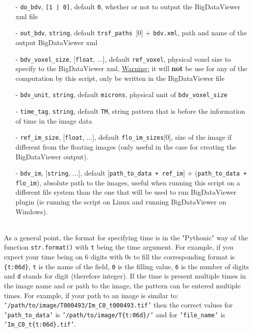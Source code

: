 \documentclass[10pt,a4paper]{book}
\newcommand{\option}[1]{{\texttt{'#1'}}}
\begin{document}
\begin{enumerate}
\item[-] \texttt{do\_bdv}, \texttt{[1 | 0]}, default \texttt{0}, whether or not to output the BigDataViewer xml file
\item[-] \texttt{out\_bdv}, \texttt{string}, default \texttt{trsf\_paths }[0] + \texttt{bdv.xml}, path and name of the output BigDataViewer xml
\item[-] \texttt{bdv\_voxel\_size}, [\texttt{float}, ...], default \texttt{ref\_voxel}, physical voxel size to specify to the BigDataViewer xml, \underline{Warning:} it will \textbf{not} be use for any of the computation by this script, only be written in the BigDataViewer file
\item[-] \texttt{bdv\_unit}, \texttt{string}, default \texttt{microns}, physical unit of \texttt{bdv\_voxel\_size}
\item[-] \texttt{time\_tag}, \texttt{string}, default \texttt{TM}, string pattern that is before the information of time in the image data
\item[-] \texttt{ref\_im\_size}, [\texttt{float}, ...], default \texttt{flo\_im\_sizes}[0], size of the image if different from the floating images (only useful in the case for creating the BigDataViewer output).
\item[-] \texttt{bdv\_im}, [\texttt{string}, ...], default [\texttt{path\_to\_data + ref\_im}] + (\texttt{path\_to\_data + flo\_im}), absolute path to the images, useful when running this script on a different file system than the one that will be used to run BigDataViewer plugin (ie running the script on Linux and running BigDataViewer on Windows).
\end{enumerate}~\\
As a general point, the format for specifying time is in the "Pythonic" way of the function \texttt{str.format()} with \texttt{t} being the time argument. For example, if you expect your time being on 6 digits with 0s to fill the corresponding format is \texttt{\{t:06d\}}, \texttt{t} is the name of the field, \texttt{0} is the filling value, \texttt{6} is the number of digits and \texttt{d} stands for digit (therefore integer). If the time is present multiple times in the image name and or path to the image, the pattern can be entered multiple times. For example, if your path to an image is similar to: \option{/path/to/image/T000493/Im\_C0\_t000493.tif} then the correct values for \option{path\_to\_data} is \option{/path/to/image/T\{t:06d\}/} and for \option{file\_name} is \option{Im\_C0\_t\{t:06d\}.tif}.
\end{document}
